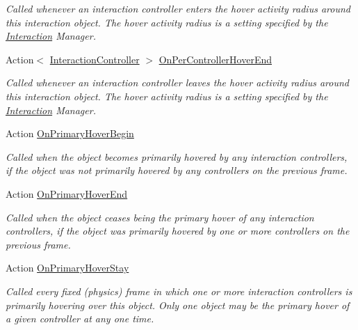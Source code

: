 \begin{DoxyCompactItemize}
\begin{DoxyCompactList}\small\item\em Called whenever an interaction controller enters the hover activity radius around this interaction object. The hover activity radius is a setting specified by the \mbox{\hyperlink{namespace_leap_1_1_unity_1_1_interaction}{Interaction}} Manager. \end{DoxyCompactList}\item 
Action$<$ \mbox{\hyperlink{class_leap_1_1_unity_1_1_interaction_1_1_interaction_controller}{Interaction\+Controller}} $>$ \mbox{\hyperlink{class_leap_1_1_unity_1_1_interaction_1_1_interaction_behaviour_a407a2d69375e02173dedbd4475d983ce}{On\+Per\+Controller\+Hover\+End}}
\begin{DoxyCompactList}\small\item\em Called whenever an interaction controller leaves the hover activity radius around this interaction object. The hover activity radius is a setting specified by the \mbox{\hyperlink{namespace_leap_1_1_unity_1_1_interaction}{Interaction}} Manager. \end{DoxyCompactList}\item 
Action \mbox{\hyperlink{class_leap_1_1_unity_1_1_interaction_1_1_interaction_behaviour_aaeb5f857f9d3a44ea529c010e2ef1ac1}{On\+Primary\+Hover\+Begin}}
\begin{DoxyCompactList}\small\item\em Called when the object becomes primarily hovered by any interaction controllers, if the object was not primarily hovered by any controllers on the previous frame. \end{DoxyCompactList}\item 
Action \mbox{\hyperlink{class_leap_1_1_unity_1_1_interaction_1_1_interaction_behaviour_a9ac3f7f2d517f5a5deaa87ab34954bb4}{On\+Primary\+Hover\+End}}
\begin{DoxyCompactList}\small\item\em Called when the object ceases being the primary hover of any interaction controllers, if the object was primarily hovered by one or more controllers on the previous frame. \end{DoxyCompactList}\item 
Action \mbox{\hyperlink{class_leap_1_1_unity_1_1_interaction_1_1_interaction_behaviour_a0f4557ef35de620c7f19128c2e47fbd0}{On\+Primary\+Hover\+Stay}}
\begin{DoxyCompactList}\small\item\em Called every fixed (physics) frame in which one or more interaction controllers is primarily hovering over this object. Only one object may be the primary hover of a given controller at any one time. \end{DoxyCompactList}\item 

\end{DoxyCompactItemize}

